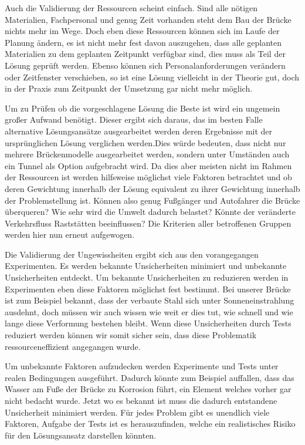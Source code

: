     Auch die Validierung der Ressourcen scheint einfach. Sind alle nötigen Materialien, Fachpersonal 
    und genug Zeit vorhanden steht dem Bau der Brücke nichts mehr im Wege. Doch eben diese Ressourcen 
    können sich im Laufe der Planung ändern, es ist nicht mehr fest davon auszugehen, dass alle 
    geplanten Materialien zu dem geplanten Zeitpunkt verfügbar sind, dies muss als Teil der Lösung 
    geprüft werden. Ebenso können sich Personalanforderungen verändern oder Zeitfenster verschieben, 
    so ist eine Lösung vielleicht in der Theorie gut, doch in der Praxis zum Zeitpunkt der Umsetzung 
    gar nicht mehr möglich.

    Um zu Prüfen ob die vorgeschlagene Lösung die Beste ist wird ein ungemein großer Aufwand benötigt. 
    Dieser ergibt sich daraus, das im besten Falle alternative Lösungsansätze ausgearbeitet werden 
    deren Ergebnisse mit der ursprünglichen Lösung verglichen werden.Dies würde bedeuten, dass nicht 
    nur mehrere Brückenmodelle ausgearbeitet werden, sondern unter Umständen auch ein Tunnel als 
    Option aufgebracht wird. Da dies aber meisten nicht im Rahmen der Ressourcen ist werden 
    hilfsweise möglichst viele Faktoren betrachtet und ob deren Gewichtung innerhalb der Lösung 
    equivalent zu ihrer Gewichtung innerhalb der Problemstellung ist. Können also genug Fußgänger 
    und Autofahrer die Brücke überqueren? Wie sehr wird die Umwelt dadurch belastet? Könnte der 
    veränderte Verkehrsfluss Raststätten beeinflussen? Die Kriterien aller betroffenen Gruppen 
    werden hier nun erneut aufgewogen.

    Die Validierung der Ungewissheiten ergibt sich aus den vorangegangen Experimenten.  Es werden 
    bekannte Unsicherheiten minimiert und unbekannte Unsicherheiten entdeckt. 
    Um bekannte Unsicherheiten zu reduzieren werden in Experimenten eben diese Faktoren möglichst 
    fest bestimmt. Bei unserer Brücke ist zum Beispiel bekannt, dass der verbaute Stahl sich unter 
    Sonneneinstrahlung ausdehnt, doch müssen wir auch wissen wie weit er dies tut, wie schnell und 
    wie lange diese Verformung bestehen bleibt. Wenn diese Unsicherheiten durch Tests reduziert werden 
    können wir somit sicher sein, dass diese Problematik ressourceneffizient angegangen wurde. 

    Um unbekannte Faktoren aufzudecken werden Experimente und Tests unter realen Bedingungen 
    ausgeführt. Dadurch könnte zum Beispiel auffallen, dass das Wasser am Fuße der Brücke zu 
    Korrosion führt, ein Element welches vorher gar nicht bedacht wurde. Jetzt wo es bekannt 
    ist muss die dadurch entstandene Unsicherheit minimiert werden.  Für jedes Problem gibt es 
    unendlich viele Faktoren, Aufgabe der Tests ist es herauszufinden, welche ein realistisches 
    Risiko für den Lösungsansatz darstellen könnten.

